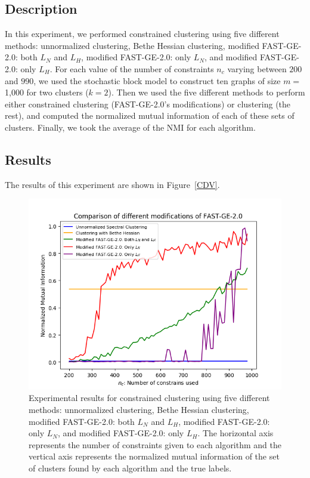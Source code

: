 \subsection*{Description}
In this experiment, we performed constrained clustering using five different methods: unnormalized clustering, Bethe Hessian clustering, modified FAST-GE-2.0: both $L_N$ and $L_H$, modified FAST-GE-2.0: only $L_N$, and modified FAST-GE-2.0: only $L_H$. 
For each value of the number of constraints $n_c$ varying between $200$ and $990$, we used the stochastic block model to construct ten graphs of size $m =$ 1,000 for two clusters ($k=2$). Then we used the five different methods to perform either constrained clustering (FAST-GE-2.0's modifications) or clustering (the rest), and computed the normalized mutual information of each of these sets of clusters.
Finally, we took the average of the NMI for each algorithm.

\subsection*{Results}
The results of this experiment are shown in Figure~\vref{CDV}.

\begin{figure}[h]
\begin{center}
\includegraphics[width=14cm]{figures/CDV1.png}
\end{center}
   \caption[Experimental results for constrained clustering using five different methods]{Experimental results for constrained clustering using five different methods: unnormalized clustering, Bethe Hessian clustering, modified FAST-GE-2.0: both $L_N$ and $L_H$, modified FAST-GE-2.0: only $L_N$, and modified FAST-GE-2.0: only $L_H$. The horizontal axis represents the number of constraints given to each algorithm and the vertical axis represents the normalized mutual information of the set of clusters found by each algorithm and the true labels.}
\label{CDV}
\end{figure}

